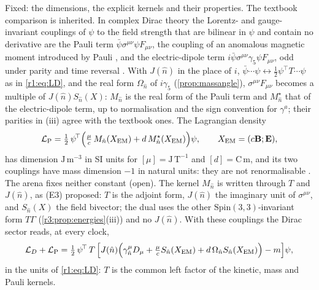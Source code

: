 Fixed: the dimensions, the explicit kernels and their properties. The textbook
comparison is inherited. In complex Dirac theory the Lorentz- and gauge-invariant couplings of $\psi$ to the field strength that are bilinear in
$\psi$ and contain no derivative are the Pauli term $\bar\psi\sigma^{\mu\nu}\psi F_{\mu\nu}$, the coupling of an anomalous magnetic moment introduced by
Pauli \cite{Pauli41}, and the electric-dipole term $i\bar\psi\sigma^{\mu\nu}\gamma_5\psi F_{\mu\nu}$, odd under parity and time reversal
\cite{PeskinSchroeder,ItzyksonZuber}. With $J(\hat n)$ in the place of $i$, $\bar\psi\cdots\psi\leftrightarrow\tfrac12\psi^{\!\top}T\cdots\psi$ as in \cref{r1:eq:LD}, and the real
form $\Omega_{\hat n}$ of $i\gamma_5$ (\cref{prop:massangle}), $\sigma^{\mu\nu}F_{\mu\nu}$ becomes a multiple of $J(\hat n)S_{\hat n}(X)$: $M_{\hat n}$ is the real form of the Pauli term
and $M^\star_{\hat n}$ that of the electric-dipole term, up to normalisation and the sign convention for $\gamma^a$; their parities in (iii) agree with the
textbook ones. The Lagrangian density
\begin{equation}
\label{r4:eq:LP}
\mathcal L_{\rm P}=\tfrac12\,\psi^{\!\top}\Bigl(\tfrac{\mu}{c}\,M_{\hat n}(X_{\rm EM})+d\,M^\star_{\hat n}(X_{\rm EM})\Bigr)\psi,\qquad X_{\rm EM}=(c\mathbf B;\mathbf E),
\end{equation}
has dimension $\mathrm{J\,m^{-3}}$ in SI units for $[\mu]=\mathrm{J\,T^{-1}}$ and $[d]=\mathrm{C\,m}$, and its two couplings have mass dimension $-1$ in natural units: they
are not renormalisable \cite{PeskinSchroeder}. The arena fixes neither constant (open). The kernel $M_{\hat n}$ is written through $T$ and $J(\hat n)$, as (E3) proposed:
$T$ is the adjoint form, $J(\hat n)$ the imaginary unit of $\sigma^{\mu\nu}$, and $S_{\hat n}(X)$ the field bivector; the dual uses the other $\mathrm{Spin}(3,3)$-invariant
form $T\Gamma$ (\cref{r3:prop:energies}(iii)) and no $J(\hat n)$. With these couplings the Dirac sector reads, at every clock,
\[
\mathcal L_D+\mathcal L_{\rm P}=\tfrac12\,\psi^{\!\top}\,T\,\Bigl[J(\hat n)\Bigl(\gamma^\mu_{\hat n}D_\mu+\tfrac{\mu}{c}S_{\hat n}(X_{\rm EM})+d\,\Omega_{\hat n}S_{\hat n}(X_{\rm EM})\Bigr)-m\Bigr]\psi,
\]
in the units of \cref{r1:eq:LD}: $T$ is the common left factor of the kinetic, mass and Pauli kernels.

